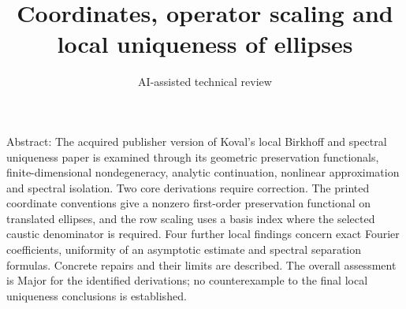 \documentclass[10pt]{article}
\title{Coordinates, operator scaling and local uniqueness of ellipses}
\author{AI-assisted technical review}
\date{}
\begin{document}
\maketitle
Abstract: The acquired publisher version of Koval’s local Birkhoff and spectral uniqueness paper is examined through its geometric preservation functionals, finite-dimensional nondegeneracy, analytic continuation, nonlinear approximation and spectral isolation. Two core derivations require correction. The printed coordinate conventions give a nonzero first-order preservation functional on translated ellipses, and the row scaling uses a basis index where the selected caustic denominator is required. Four further local findings concern exact Fourier coefficients, uniformity of an asymptotic estimate and spectral separation formulas. Concrete repairs and their limits are described. The overall assessment is Major for the identified derivations; no counterexample to the final local uniqueness conclusions is established.\par
\end{document}
